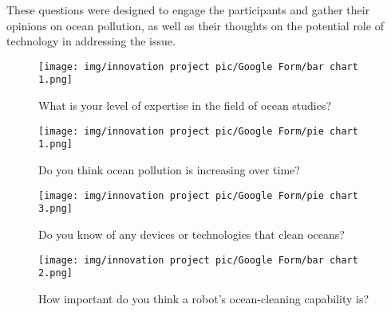 These questions were designed to engage the participants and gather their opinions on ocean pollution, as well as their thoughts on the potential role of technology in addressing the issue.

\begin{figure}[h!]
    \centering
    \begin{minipage}{0.45\textwidth}
        \centering
        \texttt{[image: img/innovation project pic/Google Form/bar chart 1.png]}
        \caption{What is your level of expertise in the field of ocean studies?}
    \end{minipage}
    \hfill
    \begin{minipage}{0.45\textwidth}
        \centering
        \texttt{[image: img/innovation project pic/Google Form/pie chart 1.png]}
        \caption{Do you think ocean pollution is increasing over time?}
    \end{minipage}
    
    \vspace{1cm} %
    
    \begin{minipage}{0.45\textwidth}
        \centering
        \texttt{[image: img/innovation project pic/Google Form/pie chart 3.png]}
        \caption{Do you know of any devices or technologies that clean oceans?}
    \end{minipage}
    \hfill
    \begin{minipage}{0.45\textwidth}
        \centering
        \texttt{[image: img/innovation project pic/Google Form/bar chart 2.png]}
        \caption{How important do you think a robot's ocean-cleaning capability is?}
    \end{minipage}
\end{figure}


